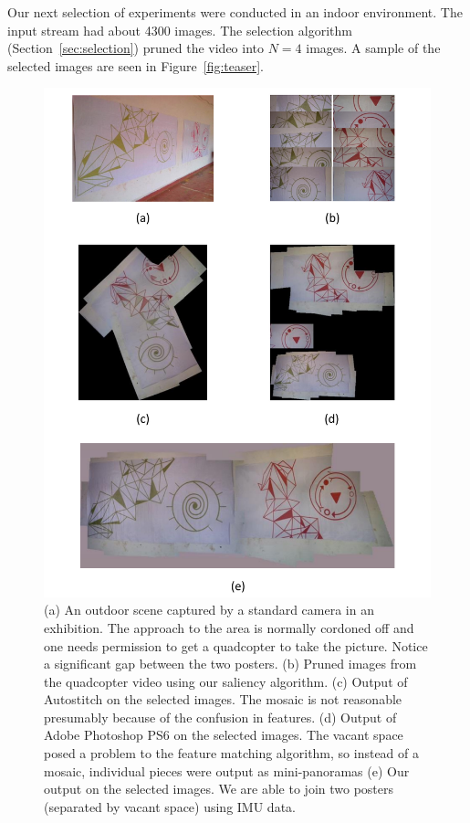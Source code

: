 Our next selection of experiments were conducted in an indoor
environment.  The input stream had about 4300
images. The selection algorithm (Section~\ref{sec:selection}) pruned the video
into $N=4$ images.
A sample of the selected images are seen in Figure~\ref{fig:teaser}.

\begin{figure}[h!]
\centering
\includegraphics[width=0.86\linewidth]{figures/results}
\caption{(a) An outdoor scene captured by a standard camera in an
  exhibition. The approach to the area is normally cordoned off and one
  needs permission to get a quadcopter to take the picture.  Notice a
  significant gap between the two posters.  (b) Pruned images from the
  quadcopter video using our saliency algorithm. (c) Output of
  Autostitch on the selected images. The mosaic is not reasonable
  presumably because of the confusion in features. (d) Output of Adobe
  Photoshop PS6 on the selected images. The vacant space posed a
  problem to the feature matching algorithm, so instead of a mosaic,
  individual pieces were output as mini-panoramas (e) Our output on
  the selected images. We are able to join two posters (separated by
  vacant space) using IMU data.}
\label{fig:results}
\end{figure}

